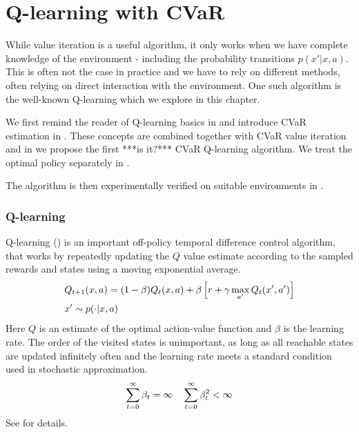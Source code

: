 \chapter{Q-learning with CVaR}\label{ch:qlearning}

While value iteration is a useful algorithm, it only works when we have complete knowledge of the environment - including the probability transitions $p(x'|x,a)$. This is often not the case in practice and we have to rely on different methods, often relying on direct interaction with the environment. One such algorithm is the well-known Q-learning which we explore in this chapter.

We first remind the reader of Q-learning basics in  and introduce CVaR estimation in . These concepts are combined together with CVaR value iteration and in  we propose the first ***is it?*** CVaR Q-learning algorithm. We treat the optimal policy separately in .

The algorithm is then experimentally verified on suitable environments in .

\subsection{Q-learning}\label{sec:qlearning}

Q-learning (\citet{watkins1992q}) is an important off-policy temporal difference control algorithm, that works by repeatedly updating the $Q$ value estimate according to the sampled rewards and states using a moving exponential average.
\begin{equation}
\begin{split}
&Q_{t+1}(x, a) = (1-\beta)Q_{t}(x, a) + \beta\left[ {r + \gamma \max_{a'} Q_t(x', a')} \right]\\
&x' \sim p(\cdot|x, a)
\end{split}
\end{equation}
Here $Q$ is an estimate of the optimal action-value function  and $\beta$ is the learning rate. The order of the visited states is unimportant, as long as all reachable states are updated infinitely often and the learning rate meets a standard condition used in stochastic approximation.
\begin{equation*}
\sum_{t=0}^\infty \beta_t = \infty  \quad \sum_{t=0}^\infty \beta_t^2 < \infty\\
\end{equation*}
See \citet{jaakkola1994convergence} for details.

